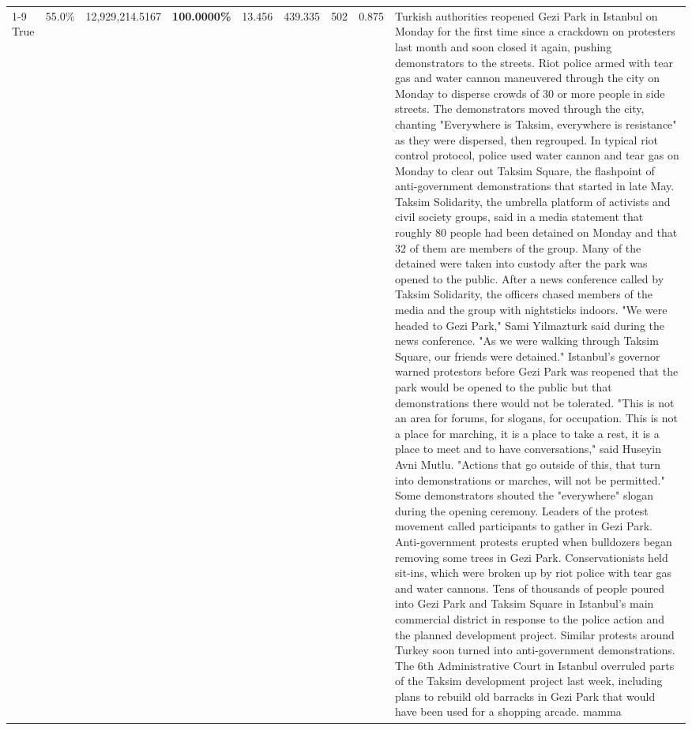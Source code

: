 \begin{table}[H]
\begin{tabular}{lllrlllll}
\cline{1-9}
True & 55.0\% & 12,929,214.5167 & \bfseries \color{red} 100.0000\% & 13.456 & 439.335 & 502 & 0.875 & Turkish authorities reopened Gezi Park in Istanbul on Monday for the first time since a crackdown on protesters last month and soon closed it again, pushing demonstrators to the streets. Riot police armed with tear gas and water cannon maneuvered through the city on Monday to disperse crowds of 30 or more people in side streets. The demonstrators moved through the city, chanting "Everywhere is Taksim, everywhere is resistance" as they were dispersed, then regrouped. In typical riot control protocol, police used water cannon and tear gas on Monday to clear out Taksim Square, the flashpoint of anti-government demonstrations that started in late May. Taksim Solidarity, the umbrella platform of activists and civil society groups, said in a media statement that roughly 80 people had been detained on Monday and that 32 of them are members of the group. Many of the detained were taken into custody after the park was opened to the public. After a news conference called by Taksim Solidarity, the officers chased members of the media and the group with nightsticks indoors. "We were headed to Gezi Park," Sami Yilmazturk said during the news conference. "As we were walking through Taksim Square, our friends were detained." Istanbul's governor warned protestors before Gezi Park was reopened that the park would be opened to the public but that demonstrations there would not be tolerated. "This is not an area for forums, for slogans, for occupation. This is not a place for marching, it is a place to take a rest, it is a place to meet and to have conversations," said Huseyin Avni Mutlu. "Actions that go outside of this, that turn into demonstrations or marches, will not be permitted." Some demonstrators shouted the "everywhere" slogan during the opening ceremony. Leaders of the protest movement called participants to gather in Gezi Park. Anti-government protests erupted when bulldozers began removing some trees in Gezi Park. Conservationists held sit-ins, which were broken up by riot police with tear gas and water cannons. Tens of thousands of people poured into Gezi Park and Taksim Square in Istanbul's main commercial district in response to the police action and the planned development project. Similar protests around Turkey soon turned into anti-government demonstrations. The 6th Administrative Court in Istanbul overruled parts of the Taksim development project last week, including plans to rebuild old barracks in Gezi Park that would have been used for a shopping arcade. mamma \\

\end{tabular}
\end{table}
